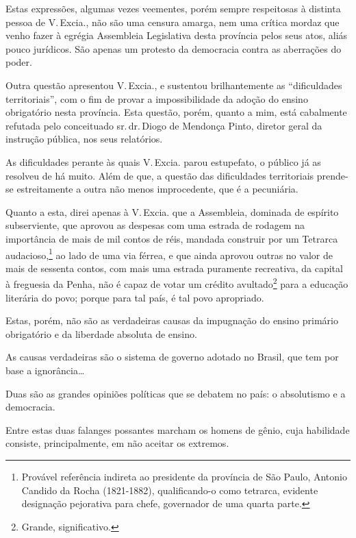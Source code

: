 Estas expressões, algumas vezes veementes, porém sempre respeitosas à
distinta pessoa de V.\,Excia., não são uma censura amarga, nem uma
crítica mordaz que venho fazer à egrégia Assembleia Legislativa desta
província pelos seus atos, aliás pouco jurídicos. São apenas um protesto
da democracia contra as aberrações do poder.

Outra questão apresentou V.\,Excia., e sustentou brilhantemente as
``dificuldades territoriais'', com o fim de provar a impossibilidade da
adoção do ensino obrigatório nesta província. Esta questão, porém,
quanto a mim, está cabalmente refutada pelo conceituado sr.\,dr.\,Diogo de
Mendonça Pinto, diretor geral da instrução pública, nos seus relatórios.

As dificuldades perante às quais V.\,Excia. parou estupefato, o público
já as resolveu de há muito. Além de que, a questão das dificuldades
territoriais prende-se estreitamente a outra não menos improcedente, que
é a pecuniária.

Quanto a esta, direi apenas à V.\,Excia. que a Assembleia, dominada de
espírito subserviente, que aprovou as despesas com uma estrada de
rodagem na importância de mais de mil contos de réis, mandada construir
por um Tetrarca audacioso,\footnote{Provável referência indireta ao
  presidente da província de São Paulo, Antonio Candido da Rocha
  (1821-1882), qualificando-o como tetrarca, evidente designação
  pejorativa para chefe, governador de uma quarta parte.} ao lado de
uma via férrea, e que ainda aprovou outras no valor de mais de sessenta
contos, com mais uma estrada puramente recreativa, da capital à
freguesia da Penha, não é capaz de votar um crédito avultado\footnote{
  Grande, significativo.} para a educação literária do povo; porque para
tal país, é tal povo apropriado.

Estas, porém, não são as verdadeiras causas da impugnação do ensino
primário obrigatório e da liberdade absoluta de ensino.

As causas verdadeiras são o sistema de governo adotado no Brasil, que
tem por base a ignorância\ldots

Duas são as grandes opiniões políticas que se debatem no país: o
absolutismo e a democracia.

Entre estas duas falanges possantes marcham os homens de gênio, cuja
habilidade consiste, principalmente, em não aceitar os extremos.

